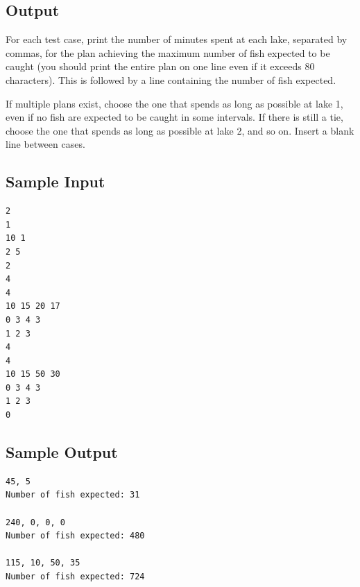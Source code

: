 \documentclass{report}
\begin{document}
\subsection{Output}
\label{sub:output}
For each test case, print the number of minutes spent at each lake, separated by commas, for the plan achieving the maximum number of fish expected to be caught (you should print the entire plan on one line even if it exceeds 80 characters). This is followed by a line containing the number of fish expected. \par
If multiple plans exist, choose the one that spends as long as possible at lake 1, even if no fish are expected to be caught in some intervals. If there is still a tie, choose the one that spends as long as possible at lake 2, and so on. Insert a blank line between cases.

\subsection{Sample Input}
\begin{lstlisting}
2
1
10 1
2 5
2
4
4
10 15 20 17
0 3 4 3
1 2 3
4
4
10 15 50 30
0 3 4 3
1 2 3
0
\end{lstlisting}

\subsection{Sample Output}
\begin{lstlisting}
45, 5
Number of fish expected: 31

240, 0, 0, 0
Number of fish expected: 480

115, 10, 50, 35
Number of fish expected: 724
\end{lstlisting}
\end{document}
